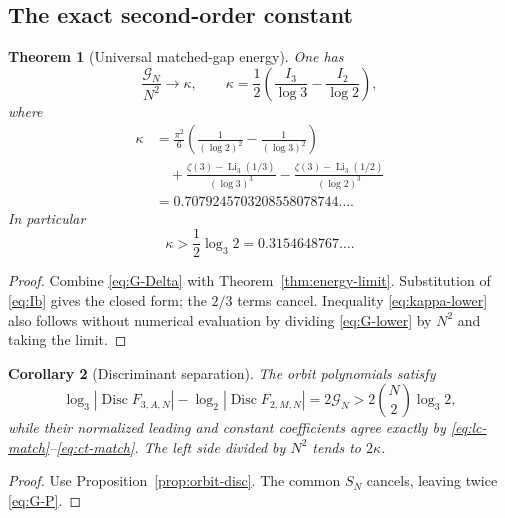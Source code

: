\documentclass[11pt,oneside]{article}
\newtheorem{theorem}{Theorem}[section]
\newtheorem{corollary}[theorem]{Corollary}
\theoremstyle{definition}
\theoremstyle{remark}
\newcommand{\Li}{\operatorname{Li}}
\begin{document}
\subsection{The exact second-order constant}

\begin{theorem}[Universal matched-gap energy]
\label{thm:kappa}
One has
\begin{equation}
 \frac{\mathcal G_N}{N^2}\longrightarrow\kappa,
 \qquad
 \kappa=\frac12\left(\frac{I_3}{\log3}-\frac{I_2}{\log2}\right),
 \label{eq:kappa}
\end{equation}
where
\begin{align}
 \kappa
 &=\frac{\pi^2}{6}
 \left(\frac1{(\log2)^2}-\frac1{(\log3)^2}\right) \\
 &\quad +\frac{\zeta(3)-\Li_3(1/3)}{(\log3)^3}
 -\frac{\zeta(3)-\Li_3(1/2)}{(\log2)^3} \\
 &=0.7079245703208558078744\ldots.
 \label{eq:kappa-closed}
\end{align}
In particular
\begin{equation}
 \kappa>\frac12\log_3 2=0.3154648767\ldots.
 \label{eq:kappa-lower}
\end{equation}
\end{theorem}

\begin{proof}
Combine \eqref{eq:G-Delta} with Theorem~\ref{thm:energy-limit}.  Substitution of
\eqref{eq:Ib} gives the closed form; the $2/3$ terms cancel.  Inequality
\eqref{eq:kappa-lower} also follows without numerical evaluation by dividing
\eqref{eq:G-lower} by $N^2$ and taking the limit.
\end{proof}

\begin{corollary}[Discriminant separation]
\label{cor:disc-separation}
The orbit polynomials satisfy
\begin{equation}
 \log_3|\operatorname{Disc}F_{3,A,N}|
 -\log_2|\operatorname{Disc}F_{2,M,N}|
 =2\mathcal G_N
 >2\binom N2\log_3 2,
 \label{eq:disc-separation}
\end{equation}
while their normalized leading and constant coefficients agree exactly by
\eqref{eq:lc-match}--\eqref{eq:ct-match}.  The left side divided by $N^2$ tends to $2\kappa$.
\end{corollary}

\begin{proof}
Use Proposition~\ref{prop:orbit-disc}.  The common $S_N$ cancels, leaving twice
\eqref{eq:G-P}.
\end{proof}
\end{document}
